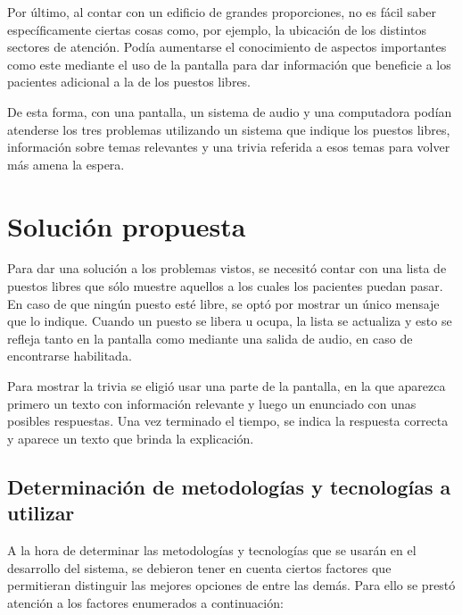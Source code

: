 \documentclass{article}
\begin{document}
Por último, al contar con un edificio de grandes proporciones, no es fácil saber específicamente ciertas cosas como, por ejemplo, la ubicación de los distintos sectores de atención. Podía aumentarse el conocimiento de aspectos importantes como este mediante el uso de la pantalla para dar información que beneficie a los pacientes adicional a la de los puestos libres.

De esta forma, con una pantalla, un sistema de audio y una computadora podían atenderse los tres problemas utilizando un sistema que indique los puestos libres, información sobre temas relevantes y una trivia referida a esos temas para volver más amena la espera.
\newpage
\section{Solución propuesta}
Para dar una solución a los problemas vistos, se necesitó contar con una lista de puestos libres que sólo muestre aquellos a los cuales los pacientes puedan pasar. En caso de que ningún puesto esté libre, se optó por mostrar un único mensaje que lo indique. Cuando un puesto se libera u ocupa, la lista se actualiza y esto se refleja tanto en la pantalla como mediante una salida de audio, en caso de encontrarse habilitada.

Para mostrar la trivia se eligió usar una parte de la pantalla, en la que aparezca primero un texto con información relevante y luego un enunciado con unas posibles respuestas. Una vez terminado el tiempo, se indica la respuesta correcta y aparece un texto que brinda la explicación.
\newpage
\subsection{Determinación de metodologías y tecnologías a utilizar}
A la hora de determinar las metodologías y tecnologías que se usarán en el desarrollo del sistema, se debieron tener en cuenta ciertos factores que permitieran distinguir las mejores opciones de entre las demás. Para ello se prestó atención a los factores enumerados a continuación:
\end{document}
